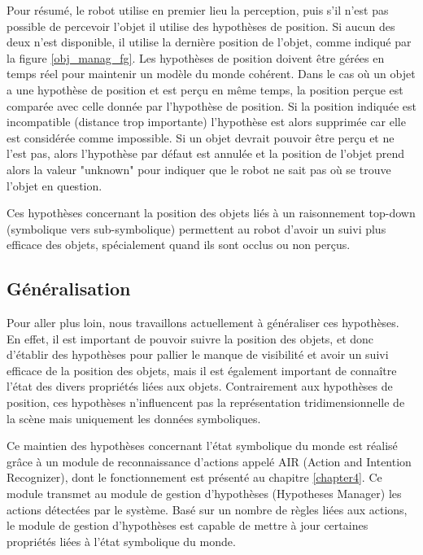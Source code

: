 \documentclass[a4paper,11pt,twoside]{StyleThese}
\begin{document}
Pour résumé, le robot utilise en premier lieu la perception, puis s'il n'est pas possible de percevoir l'objet il utilise des hypothèses de position.
Si aucun des deux n'est disponible, il utilise la dernière position de l'objet, comme indiqué par la figure \ref{obj_manag_fg}.
Les hypothèses de position doivent être gérées en temps réel pour maintenir un modèle du monde cohérent.
Dans le cas où un objet a une hypothèse de position et est perçu en même temps, la position perçue est comparée avec celle donnée par l'hypothèse de position. Si la  position indiquée est incompatible (distance trop importante) l'hypothèse est alors supprimée car elle est considérée comme impossible.
Si un objet devrait pouvoir être perçu et ne l'est pas, alors l'hypothèse par défaut est annulée et la position de l'objet prend alors la valeur "unknown" pour indiquer que le robot ne sait pas où se trouve l'objet en question.

Ces hypothèses concernant la position des objets liés à un raisonnement top-down (symbolique vers sub-symbolique) permettent au robot d'avoir un suivi plus efficace des objets, spécialement quand ils sont occlus ou non perçus.


\subsection{Généralisation}



Pour aller plus loin, nous travaillons actuellement à généraliser ces hypothèses. En effet, il est important de pouvoir suivre la position des objets, et donc d'établir des hypothèses pour pallier le manque de visibilité et avoir un suivi efficace de la position des objets, mais il est également important de connaître l'état des divers propriétés liées aux objets. Contrairement aux hypothèses de position, ces hypothèses n'influencent pas la représentation tridimensionnelle de la scène mais uniquement les données symboliques.

Ce maintien des hypothèses concernant l'état symbolique du monde est réalisé grâce à un module de reconnaissance d'actions appelé AIR (Action and Intention Recognizer), dont le fonctionnement est présenté au chapitre \ref{chapter4}.
Ce module transmet au module de gestion d'hypothèses (Hypotheses Manager) les actions détectées par le système.
Basé sur un nombre de règles liées aux actions, le module de gestion d'hypothèses est capable de mettre à jour certaines propriétés liées à l'état symbolique du monde.
\end{document}

